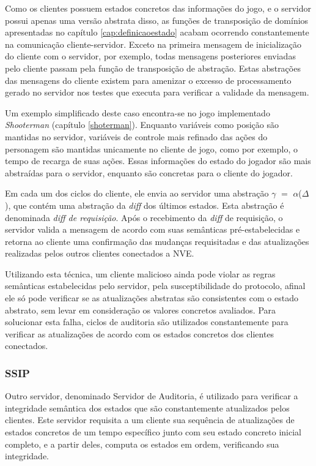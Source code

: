 Como os clientes possuem estados concretos das informações do jogo, e o servidor possui apenas uma versão abstrata disso,
as funções de transposição de domínios apresentadas no capítulo \ref{cap:definicaoestado} acabam ocorrendo constantemente na comunicação cliente-servidor. Exceto na primeira mensagem de inicialização do cliente com o servidor, por exemplo, todas mensagens posteriores enviadas pelo cliente passam pela função de transposição de abstração. Estas abstrações das mensagens do cliente existem para amenizar o excesso de processamento gerado no servidor nos testes que executa para verificar a validade da mensagem. 

Um exemplo simplificado deste caso encontra-se no jogo implementado \textit{Shooterman} (capítulo \ref{shoterman}). Enquanto variáveis como posição são mantidas no servidor, variáveis de controle mais refinado das ações do personagem são mantidas unicamente no cliente de jogo, como por exemplo, o tempo de recarga de suas ações. Essas informações do estado do jogador são mais abstraídas para o servidor, enquanto são concretas para o cliente do jogador.

Em cada um dos ciclos do cliente, ele envia ao servidor uma abstração $\gamma$ $=$ $\alpha$($\Delta$), que contém uma abstração da \textit{diff} dos últimos estados. Esta abstração é denominada \textit{diff de requisição}. Após o recebimento da \textit{diff} de requisição, o servidor valida a mensagem de acordo com suas semânticas pré-estabelecidas e retorna ao cliente uma confirmação das mudanças requisitadas e das atualizações realizadas pelos outros clientes conectados a NVE. 

Utilizando esta técnica, um cliente malicioso ainda pode violar as regras semânticas estabelecidas pelo servidor, pela susceptibilidade do protocolo, afinal ele só pode verificar se as atualizações abstratas são consistentes com o estado abstrato, sem levar em consideração os valores concretos avaliados. Para solucionar esta falha, ciclos de auditoria são utilizados constantemente para verificar as atualizações de acordo com os estados concretos dos clientes conectados.

\subsubsection{SSIP}
Outro servidor, denominado Servidor de Auditoria, é utilizado para verificar a integridade semântica dos estados que são constantemente atualizados pelos clientes. Este servidor requisita a um cliente sua sequência de atualizações de estados concretos de um tempo específico junto com seu estado concreto inicial completo, e a partir deles, computa os estados em ordem, verificando sua integridade.

